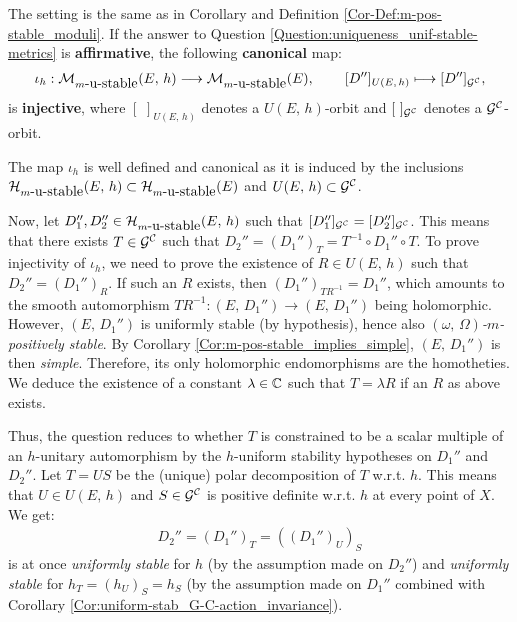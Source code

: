 \documentclass[12pt]{article}
\begin{document}
\begin{Cor}\label{Cor:can-injection_u-stable_moduli-spaces} The setting is the same as in Corollary and Definition \ref{Cor-Def:m-pos-stable_moduli}. If the answer to Question \ref{Question:uniqueness_unif-stable-metrics} is {\bf affirmative}, the following {\bf canonical} map: \begin{eqnarray*}\iota_h:{\cal M}_{m\mbox{-u-stable}}(E,\, h)\longrightarrow{\cal M}_{m\mbox{-u-stable}}(E), \hspace{5ex} [D'']_{U(E,\, h)}\longmapsto[D'']_{{\cal G}^{\cal C}},\end{eqnarray*} is {\bf injective}, where $[\,\,]_{U(E,\, h)}$ denotes a $U(E,\, h)$-orbit and $[\,\,]_{{\cal G}^{\cal C}}$ denotes a ${\cal G}^{\cal C}$-orbit.

\end{Cor}  

 The map $\iota_h$ is well defined and canonical as it is induced by the inclusions ${\cal H}_{m\mbox{-u-stable}}(E,\,h)\subset{\cal H}_{m\mbox{-u-stable}}(E)$ and $U(E,\,h)\subset{\cal G}^{\cal C}$.

Now, let $D_1'', D_2''\in{\cal H}_{m\mbox{-u-stable}}(E,\,h)$ such that $[D_1'']_{{\cal G}^{\cal C}} = [D_2'']_{{\cal G}^{\cal C}}$. This means that there exists $T\in{\cal G}^{\cal C}$ such that $D_2'' = (D_1'')_T = T^{-1}\circ D_1''\circ T$. To prove injectivity of $\iota_h$, we need to prove the existence of $R\in U(E,\,h)$ such that $D_2'' = (D_1'')_R$. If such an $R$ exists, then $(D_1'')_{TR^{-1}} = D_1''$, which amounts to the smooth automorphism $TR^{-1}:(E,\,D_1'')\longrightarrow(E,\,D_1'')$ being holomorphic. However, $(E,\,D_1'')$ is uniformly stable (by hypothesis), hence also {\it $(\omega,\,\Omega)$-$m$-positively stable}. By Corollary \ref{Cor:m-pos-stable_implies_simple}, $(E,\,D_1'')$ is then {\it simple}. Therefore, its only holomorphic endomorphisms are the homotheties. We deduce the existence of a constant $\lambda\in\mathbb{C}$ such that $T=\lambda R$ if an $R$ as above exists.

Thus, the question reduces to whether $T$ is constrained to be a scalar multiple of an $h$-unitary automorphism by the $h$-uniform stability hypotheses on $D_1''$ and $D_2''$. Let $T = US$ be the (unique) polar decomposition of $T$ w.r.t. $h$. This means that $U\in U(E,\,h)$ and $S\in{\cal G}^{\cal C}$ is positive definite w.r.t. $h$ at every point of $X$. We get: \begin{eqnarray*}D_2'' = (D_1'')_T = ((D_1'')_U)_S\end{eqnarray*} is at once {\it uniformly stable} for $h$ (by the assumption made on $D_2''$) and {\it uniformly stable} for $h_T = (h_U)_S = h_S$ (by the assumption made on $D_1''$ combined with Corollary \ref{Cor:uniform-stab_G-C-action_invariance}).
\end{document}
